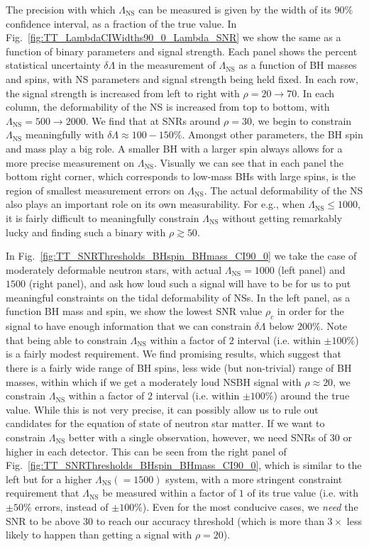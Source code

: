 \documentclass[aps,prd,amsmath,floats,floatfix, twocolumn,
superscriptaddress,nofootinbib,showpacs]{revtex4-1}
\newcommand{\lambdans}{\Lambda_\mathrm{NS}}
\newcommand{\dlambda}{\delta\Lambda}
\begin{document}
The precision with which $\lambdans$ can be measured is given by the width of 
its $90\%$ confidence interval, as a fraction of the true value. 
In Fig.~\ref{fig:TT_LambdaCIWidths90_0_Lambda_SNR} we show the same as a function
of binary parameters and signal strength. Each panel shows the percent statistical
uncertainty $\dlambda$ in the measurement of $\lambdans$ as a function of BH 
masses and spins, with NS parameters and signal strength being held fixed. 
In each row, the signal strength is increased from
left to right with $\rho = 20\rightarrow 70$. In each column, the deformability
of the NS is increased from top to bottom, with $\lambdans=500\rightarrow 2000$.
% 
We find that at SNRs around $\rho=30$, we begin to constrain $\lambdans$ 
meaningfully with $\dlambda\approx 100-150\%$. Amongst other parameters, 
the BH spin and mass play a big role. A smaller BH with a larger spin always
allows for a more precise measurement on $\lambdans$. Visually we can see that
in each panel the bottom right corner, which corresponds to low-mass BHs
with large spins, is the region of smallest measurement errors on $\lambdans$.
The actual deformability of the NS also plays an important role on its own
measurability. For e.g., when $\lambdans\leq 1000$, it is fairly difficult
to meaningfully constrain $\lambdans$ without getting remarkably lucky and
finding such a binary with $\rho\gtrsim 50$.



In Fig.~\ref{fig:TT_SNRThresholds_BHspin_BHmass_CI90_0} we take the case of
moderately deformable neutron stars, with actual $\lambdans = 1000$ (left 
panel) and $1500$ (right panel), and ask how loud such a signal will have
to be for us to put meaningful constraints on the tidal deformability of NSs.
In the left panel, as a function BH mass and spin, 
we show the lowest SNR value $\rho_c$ in order for the signal to have enough
information that we can constrain $\dlambda$ below $200\%$. Note that 
being able to constrain $\lambdans$ within a factor of $2$ interval 
(i.e. within $\pm 100\%$) is a fairly modest requirement. We find promising 
results, which suggest that there is a fairly wide range of BH spins, less
wide (but non-trivial) range of BH masses, within
which if we get a moderately loud NSBH signal with $\rho\approx 20$, we constrain
$\lambdans$ within a factor of $2$ interval (i.e. within $\pm 100\%$) around
the true value. While this is not very precise, it can possibly allow us to
rule out candidates for the equation of state of neutron star matter.
% 
If we want to constrain $\lambdans$ better with a single observation, however,
we need SNRs of $30$ or higher in each detector. This can be seen from the right
panel of Fig.~\ref{fig:TT_SNRThresholds_BHspin_BHmass_CI90_0}, which is similar
to the left but for a higher $\lambdans (=1500)$ system, with a more stringent
constraint requirement that $\lambdans$ be measured within a factor of $1$ of 
its true value (i.e. with $\pm 50\%$ errors, instead of $\pm 100\%$). Even for
the most conducive cases, we {\it need} the SNR to be above $30$ to reach our 
accuracy threshold (which is more than $3\times$ less likely to happen than
getting a signal with $\rho=20$).
\end{document}
